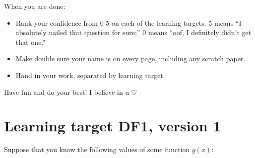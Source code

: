 When you are done:
\begin{itemize}
    \item Rank your confidence from 0-5 on each of the learning targets. 5 means ``I absolutely nailed that question for sure;'' 0 means ``oof, I definitely didn't get that one.''
    \item Make double sure your name is on every page, including any scratch paper.
    \item Hand in your work, separated by learning target.
\end{itemize}

Have fun and do your best! I believe in u $\heartsuit$


\pagebreak
\section{Learning target DF1, version 1}


\everymath{\displaystyle}

Suppose that you know the following values of some function $g(x)$:

